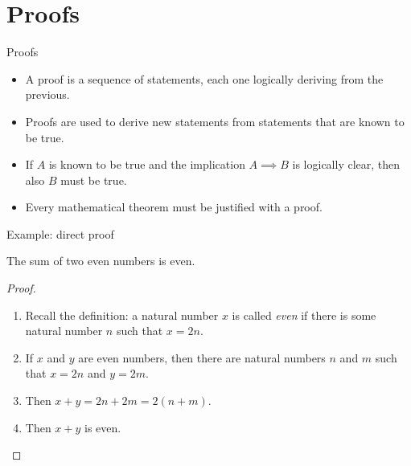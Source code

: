 \documentclass[11pt]{beamer}
\theoremstyle{definition}
\begin{document}
\section{Proofs}

\begin{frame}{Proofs}
  \begin{itemize}
    \item A proof is a sequence of statements, each one logically deriving from
          the previous.
          \pause
    \item Proofs are used to derive new statements from statements that are
          known to be true.
          \pause
    \item If $A$ is known to be true and the implication $A\implies B$ is
          logically clear, then also $B$ must be true.
          \pause
    \item Every mathematical theorem must be justified with a proof.
  \end{itemize}
\end{frame}

\begin{frame}{Example: direct proof}
  \begin{theorem}
    The sum of two even numbers is even.
  \end{theorem}
  \pause
  \begin{proof}
    \begin{enumerate}
  \item Recall the definition: a natural number $x$ is called \emph{even}
        if there is some natural number $n$ such that $x=2n$.
    \pause
  \item If $x$ and $y$ are even numbers, then there are natural numbers $n$
    and $m$ such that $x=2n$ and $y=2m$.
    \pause
  \item Then $x+y=2n+2m=2(n+m)$.
    \pause
  \item Then $x+y$ is even.
    \end{enumerate} 
  \end{proof}
\end{frame}


\end{document}
